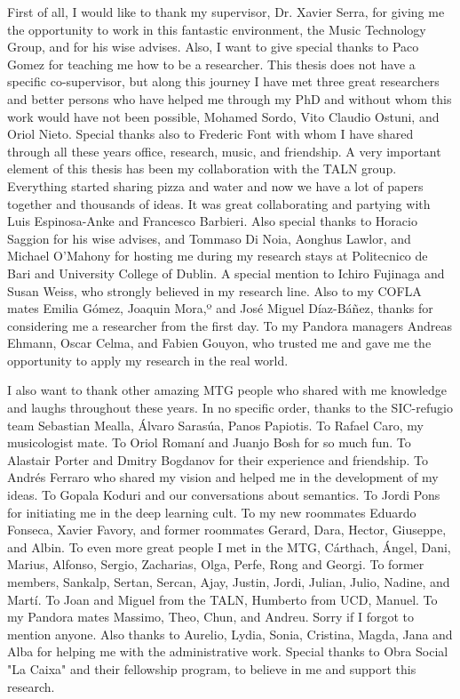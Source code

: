 First of all, I would like to thank my supervisor, Dr. Xavier Serra, for giving me the opportunity to work in this fantastic environment, the Music Technology Group, and for his wise advises. Also, I want to give special thanks to Paco Gomez for teaching me how to be a researcher. This thesis does not have a specific co-supervisor, but along this journey I have met three great researchers and better persons who have helped me through my PhD and without whom this work would have not been possible, Mohamed Sordo, Vito Claudio Ostuni, and Oriol Nieto. 
Special thanks also to Frederic Font with whom I have shared through all these years office, research, music, and friendship.
A very important element of this thesis has been my collaboration with the TALN group. Everything started sharing pizza and water and now we have a lot of papers together and thousands of ideas. It was great collaborating and partying with Luis Espinosa-Anke and Francesco Barbieri. Also special thanks to Horacio Saggion for his wise advises, and Tommaso Di Noia, Aonghus Lawlor, and Michael O'Mahony for hosting me during my research stays at Politecnico de Bari and University College of Dublin. 
A special mention to Ichiro Fujinaga and Susan Weiss, who strongly believed in my research line. Also to my COFLA mates Emilia Gómez, Joaquin Mora,º and José Miguel Díaz-Báñez, thanks for considering me a researcher from the first day.
To my Pandora managers Andreas Ehmann, Oscar Celma, and Fabien Gouyon, who trusted me and gave me the opportunity to apply my research in the real world.

I also want to thank other amazing MTG people who shared with me knowledge and laughs throughout these years. In no specific order, thanks to the SIC-refugio team
Sebastian Mealla, Álvaro Sarasúa, Panos Papiotis. To Rafael Caro, my musicologist mate. To Oriol Romaní and Juanjo Bosh for so much fun. To Alastair Porter and Dmitry Bogdanov for their experience and friendship. To Andrés Ferraro who shared my vision and helped me in the development of my ideas. To Gopala Koduri and our conversations about semantics. To Jordi Pons for initiating me in the deep learning cult. To my new roommates Eduardo Fonseca, Xavier Favory, and former roommates Gerard, Dara, Hector, Giuseppe, and Albin. To even more great people I met in the MTG, Cárthach, Ángel, Dani, Marius, Alfonso, Sergio, Zacharias, Olga, Perfe, Rong and Georgi. To former members, Sankalp, Sertan, Sercan, Ajay, Justin, Jordi, Julian, Julio, Nadine, and Martí. To Joan and Miguel from the TALN, Humberto from UCD, Manuel. To my Pandora mates Massimo, Theo, Chun, and Andreu. Sorry if I forgot to mention anyone.
Also thanks to Aurelio, Lydia, Sonia, Cristina, Magda, Jana and Alba for helping me with the administrative work.
Special thanks to Obra Social "La Caixa" and their fellowship program, to believe in me and support this research.

